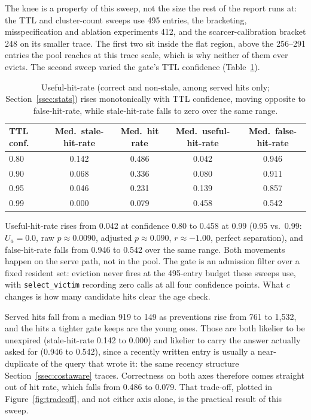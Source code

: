 \documentclass[10pt]{article}
\begin{document}
The knee is a property of this sweep, not the size the rest of the report runs at: the TTL and
cluster-count sweeps use 495 entries, the bracketing, misspecification and ablation
experiments 412, and the scarcer-calibration bracket 248 on its smaller trace. The first two
sit inside the flat region, above the 256--291 entries the pool reaches at this trace scale,
which is why neither of them ever evicts. The second sweep varied the gate's TTL confidence
(Table~\ref{tab:ttl}).

\begin{table}[H]
\centering
\caption{Useful-hit-rate (correct and non-stale, among served hits only;
Section~\ref{ssec:stats}) rises monotonically with TTL confidence, moving opposite to
false-hit-rate, while stale-hit-rate falls to zero over the same range.}
\label{tab:ttl}
\footnotesize
\begin{tabular}{lcccc}
\toprule
TTL conf.\ & Med.\ stale-hit-rate & Med.\ hit rate & Med.\ useful-hit-rate & Med.\ false-hit-rate \\
\midrule
0.80 & 0.142 & 0.486 & 0.042 & 0.946 \\
0.90 & 0.068 & 0.336 & 0.080 & 0.911 \\
0.95 & 0.046 & 0.231 & 0.139 & 0.857 \\
0.99 & 0.000 & 0.079 & 0.458 & 0.542 \\
\bottomrule
\end{tabular}
\end{table}

Useful-hit-rate rises from 0.042 at confidence 0.80 to 0.458 at 0.99 (0.95 vs.\ 0.99:
$U_a=0.0$, raw $p\approx0.0090$, adjusted $p\approx0.090$, $r\approx-1.00$, perfect
separation), and false-hit-rate falls from 0.946 to 0.542 over the same range. Both
movements happen on the serve path, not in the pool. The gate is an admission filter over a
fixed resident set: eviction never fires at the 495-entry budget these sweeps use, with
\texttt{select\_victim} recording zero calls at all four confidence points. What $c$ changes
is how many candidate hits clear the age check.

Served hits fall from a median 919 to 149 as preventions rise from 761 to 1{,}532, and the
hits a tighter gate keeps are the young ones. Those are both likelier to be unexpired
(stale-hit-rate 0.142 to 0.000) and likelier to carry the answer actually asked for (0.946 to
0.542), since a recently written entry is usually a near-duplicate of the query that wrote it:
the same recency structure Section~\ref{ssec:costaware} traces. Correctness on both axes
therefore comes straight out of hit rate, which falls from 0.486 to 0.079. That trade-off,
plotted in Figure~\ref{fig:tradeoff}, and not either axis alone, is the practical result of
this sweep.
\end{document}
